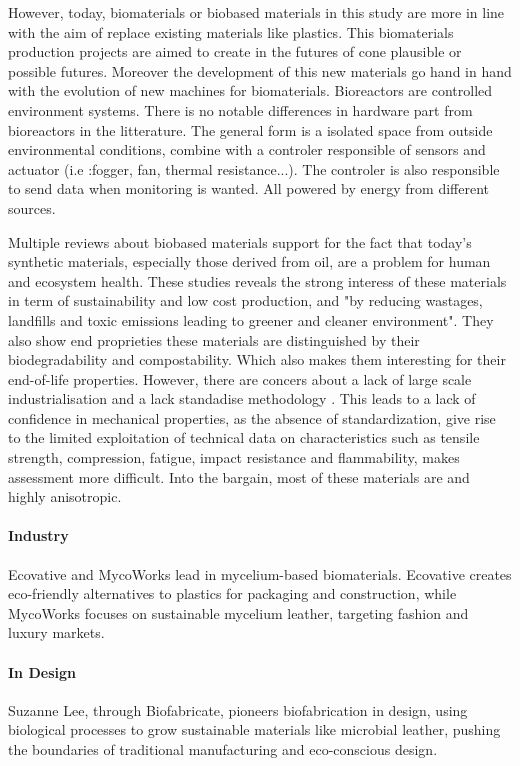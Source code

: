 However, today, biomaterials or biobased materials in this study are more in line with the aim of replace existing materials like plastics.
This biomaterials production projects are aimed to create in the futures of cone plausible or possible futures. 
Moreover the development of this new materials go hand in hand with the evolution of new machines for biomaterials. Bioreactors are controlled environment systems. There is no notable differences in hardware part from bioreactors in the litterature. The general form is a isolated space from outside environmental conditions, 
combine with a controler responsible of sensors and actuator (i.e :fogger, fan, thermal resistance...). The controler is also responsible to send data when monitoring is wanted. All powered by energy from different sources. 

Multiple reviews\cite{cottet2020biobased}\cite{vinod2020renewable}\cite{hairon2022bio} about biobased materials support for the fact that today's synthetic materials, especially those derived from oil, are a problem for human and ecosystem health.
These studies reveals the strong interess of these materials in term of sustainability and low cost production, and "by reducing wastages, landfills
and toxic emissions leading to greener and cleaner environment". They also show end proprieties these materials are distinguished by their biodegradability and compostability. Which also makes them interesting for their end-of-life properties. 
However, there are concers about a lack of large scale industrialisation and a lack standadise methodology \cite{andrew2022sustainable}. This leads to a lack of confidence in mechanical properties, as the absence of standardization, give rise to the limited exploitation of technical data on characteristics such as tensile strength, compression, fatigue, impact resistance and flammability, makes assessment more difficult.   
Into the bargain, most of these materials are and highly anisotropic.

\paragraph[short]{Industry} 
Ecovative and MycoWorks lead in mycelium-based biomaterials. Ecovative creates eco-friendly alternatives to plastics for packaging and construction, while MycoWorks focuses on sustainable mycelium leather, targeting fashion and luxury markets.
\paragraph[short]{In Design} 
Suzanne Lee, through Biofabricate, pioneers biofabrication in design, using biological processes to grow sustainable materials like microbial leather, pushing the boundaries of traditional manufacturing and eco-conscious design.


